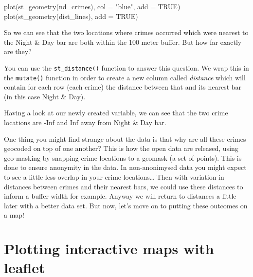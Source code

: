 \documentclass[
  krantz2]{krantz}
\makeatletter
\newenvironment{Shaded}{\begin{snugshade}}{\end{snugshade}}
\newcommand{\AttributeTok}[1]{\textcolor[rgb]{0.61,0.61,0.61}{#1}}
\newcommand{\ConstantTok}[1]{\textcolor[rgb]{0,0,0}{#1}}
\newcommand{\FunctionTok}[1]{\textcolor[rgb]{0,0,0}{#1}}
\newcommand{\NormalTok}[1]{#1}
\newcommand{\OtherTok}[1]{\textcolor[rgb]{0.37,0.37,0.37}{#1}}
\newcommand{\SpecialCharTok}[1]{\textcolor[rgb]{0,0,0}{#1}}
\newcommand{\StringTok}[1]{\textcolor[rgb]{0.5,0.5,0.5}{#1}}
\newenvironment{kframe}{%
\medskip{}
\setlength{\fboxsep}{.8em}
 \def\at@end@of@kframe{}%
 \ifinner\ifhmode%
  \def\at@end@of@kframe{\end{minipage}}%
  \begin{minipage}{\columnwidth}%
 \fi\fi%
 \def\FrameCommand##1{\hskip\@totalleftmargin \hskip-\fboxsep
 \colorbox{shadecolor}{##1}\hskip-\fboxsep
     \hskip-\linewidth \hskip-\@totalleftmargin \hskip\columnwidth}%
 \MakeFramed {\advance\hsize-\width
   \@totalleftmargin\z@ \linewidth\hsize
   \@setminipage}}%
 {\par\unskip\endMakeFramed%
 \at@end@of@kframe}
\renewenvironment{Shaded}{\begin{kframe}}{\end{kframe}}
\makeatother
\begin{document}
\begin{Shaded}
\begin{Highlighting}[]
\FunctionTok{plot}\NormalTok{(}\FunctionTok{st\_geometry}\NormalTok{(nd\_crimes), }\AttributeTok{col =} \StringTok{"blue"}\NormalTok{, }\AttributeTok{add =} \ConstantTok{TRUE}\NormalTok{)}
\FunctionTok{plot}\NormalTok{(}\FunctionTok{st\_geometry}\NormalTok{(dist\_lines), }\AttributeTok{add =} \ConstantTok{TRUE}\NormalTok{)}
\end{Highlighting}
\end{Shaded}

So we can see that the two locations where crimes occurred which were nearest to the Night \& Day bar are both within the 100 meter buffer. But how far exactly are they?

You can use the \texttt{st\_distance()} function to answer this question. We wrap this in the \texttt{mutate()} function in order to create a new column called \emph{distance} which will contain for each row (each crime) the distance between that and its nearest bar (in this case Night \& Day).

\begin{Shaded}
\end{Shaded}

Having a look at our newly created variable, we can see that the two crime locations are -Inf and Inf away from Night \& Day bar.

One thing you might find strange about the data is that why are all these crimes geocoded on top of one another? This is how the open data are released, using geo-masking by snapping crime locations to a geomask (a set of points). This is done to ensure anonymity in the data. In non-anonimysed data you might expect to see a little less overlap in your crime locations\ldots{} Then with variation in distances between crimes and their nearest bars, we could use these distances to inform a buffer width for example. Anyway we will return to distances a little later with a better data set. But now, let's move on to putting these outcomes on a map!

\hypertarget{plotting-interactive-maps-with-leaflet}{%
\section{Plotting interactive maps with leaflet}\label{plotting-interactive-maps-with-leaflet}}
\end{document}
